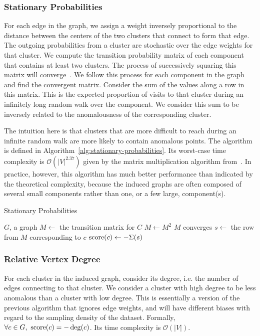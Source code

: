 \subsubsection{Stationary Probabilities}
\label{subsubsec:methods:individual-algorithms:stationary-probabilities}
For each edge in the graph, we assign a weight inversely proportional to the distance between the centers of the two clusters that connect to form that edge.
The outgoing probabilities from a cluster are stochastic over the edge weights for that cluster.
We compute the transition probability matrix of each component that contains at least two clusters.
The process of successively squaring this matrix will converge~\cite{levin2017markov}.
We follow this process for each component in the graph and find the convergent matrix.
Consider the sum of the values along a row in this matrix.
This is the expected proportion of visits to that cluster during an infinitely long random walk over the component.
We consider this sum to be inversely related to the anomalousness of the corresponding cluster.

The intuition here is that clusters that are more difficult to reach during an infinite random walk are more likely to contain anomalous points.
The algorithm is defined in Algorithm~\ref{alg:stationary-probabilities}.
Its worst-case time complexity is $\mathcal{O}(|V|^{2.37})$ given by the matrix multiplication algorithm from~\cite{alman2021refined}.
In practice, however, this algorithm has much better performance than indicated by the theoretical complexity, because the induced graphs are often composed of several small components rather than one, or a few large, component(s).

\begin{algorithm}[h]
    \caption{Stationary Probabilities}
    \label{alg:stationary-probabilities}
\begin{algorithmic}[1]
    \REQUIRE $G$, a graph
        \STATE $M \gets$ the transition matrix for $C$
        \REPEAT
            \STATE $M \gets M^2$
        \UNTIL $M$ converges
            \STATE $s \gets $ the row from $M$ corresponding to $c$
            \STATE $\operatorname{score}(c) \gets -\Sigma(s)$ 
        \ENDFOR
    \ENDFOR
\end{algorithmic}
\end{algorithm}


\subsubsection{Relative Vertex Degree}
\label{subsubsec:methods:individual-algorithms:relative-vertex-degree}
For each cluster in the induced graph, consider its degree, i.e. the number of edges connecting to that cluster.
We consider a cluster with high degree to be less anomalous than a cluster with low degree.
This is essentially a version of the previous algorithm that ignores edge weights, and will have different biases with regard to the sampling density of the dataset.
Formally, $\forall c \in G, \ \operatorname{score}(c) = -\deg(c)$.
Its time complexity is $\mathcal{O}(|V|)$.


